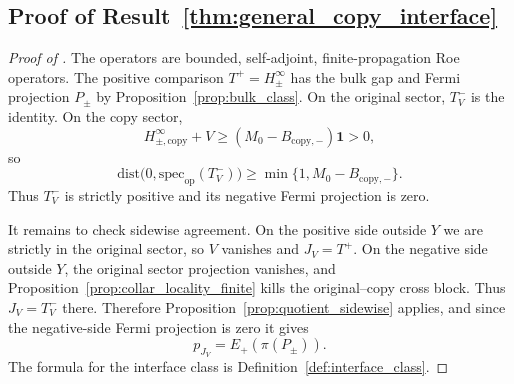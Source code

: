 \documentclass[11pt]{article}
\numberwithin{equation}{section}
\theoremstyle{definition}
\theoremstyle{remark}
\newcommand{\Id}{\mathbf{1}}
\newcommand{\spec}{\mathrm{spec}}
\newcommand{\dist}{\mathrm{dist}}
\begin{document}
\subsection{Proof of Result~\ref{thm:general_copy_interface}}\label{app:proof:thm:general_copy_interface}
\begin{proof}[Proof of ]
The operators are bounded, self-adjoint, finite-propagation Roe operators. The positive comparison
$T^+=H_\pm^\infty$ has the bulk gap and Fermi projection $P_\pm$ by
Proposition~\ref{prop:bulk_class}. On the original sector, $T_V^-$ is the identity. On the copy
sector,
\[
H_{\pm,\mathrm{copy}}^\infty+V\ge (M_0-B_{\mathrm{copy},-})\Id>0,
\]
so
\[
\dist\bigl(0,\spec_{\mathrm{op}}(T_V^-)\bigr)\ge \min\{1,M_0-B_{\mathrm{copy},-}\}.
\]
Thus $T_V^-$ is strictly positive and its negative Fermi projection is zero.

It remains to check sidewise agreement. On the positive side outside $Y$ we are strictly in the
original sector, so $V$ vanishes and $J_V=T^+$. On the negative side outside $Y$, the original
sector projection vanishes, and Proposition~\ref{prop:collar_locality_finite} kills the
original--copy cross block. Thus $J_V=T_V^-$ there. Therefore Proposition~\ref{prop:quotient_sidewise}
applies, and since the negative-side Fermi projection is zero it gives
\[
p_{J_V}=E_+(\pi(P_\pm)).
\]
The formula for the interface class is Definition~\ref{def:interface_class}.
\end{proof}
\end{document}
